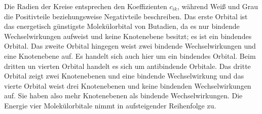 Die Radien der Kreise entsprechen den Koeffizienten $c_{ik}$, während Weiß und Grau die Positivteile beziehungsweise Negativteile beschreiben. Das erste Orbital ist das energetisch günstigste Molekülorbital von Butadien, da es nur bindende Wechselwirkungen aufweist und keine Knotenebene besitzt; es ist ein bindendes Orbital. Das zweite Orbital hingegen weist zwei bindende Wechselwirkungen und eine Knotenebene auf. Es handelt sich auch hier um ein bindendes Orbital. Beim dritten un vierten Orbital handelt es sich um antibindende Orbitale. Das dritte Orbital zeigt zwei Knotenebenen und eine bindende Wechselwirkung und das vierte Orbital weist drei Knotenebenen und keine bindenden Wechselwirkungen auf. Sie haben also mehr Knotenebenen als bindende Wechselwirkungen. Die Energie vier Molekülorbitale nimmt in aufsteigender Reihenfolge zu.
